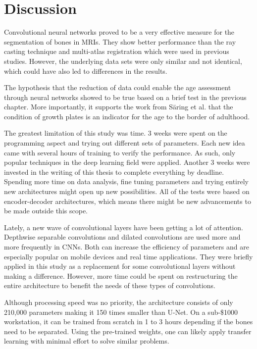\section{Discussion}

Convolutional neural networks proved to be a very effective measure for the segmentation of bones in MRIs. They show better performance than the ray casting technique and multi-atlas registration which were used in previous studies. However, the underlying data sets were only similar and not identical, which could have also led to differences in the results.

The hypothesis that the reduction of data could enable the age assessment through neural networks showed to be true based on a brief test in the previous chapter. More importantly, it supports the work from Säring et al. that the condition of growth plates is an indicator for the age to the border of adulthood.

The greatest limitation of this study was time. 3 weeks were spent on the programming aspect and trying out different sets of parameters. Each new idea came with several hours of training to verify the performance. As such, only popular techniques in the deep learning field were applied. Another 3 weeks were invested in the writing of this thesis to complete everything by deadline. Spending more time on data analysis, fine tuning parameters and trying entirely new architectures might open up new possibilities. All of the tests were based on encoder-decoder architectures, which means there might be new advancements to be made outside this scope.

Lately, a new wave of convolutional layers have been getting a lot of attention. Depthwise separable convolutions and dilated convolutions are used more and more frequently in CNNs. Both can increase the efficiency of parameters and are especially popular on mobile devices and real time applications. They were briefly applied in this study as a replacement for some convolutional layers without making a difference. However, more time could be spent on restructuring the entire architecture to benefit the needs of these types of convolutions.

Although processing speed was no priority, the architecture consists of only 210,000 parameters making it 150 times smaller than U-Net. On a sub-\$1000 workstation, it can be trained from scratch in 1 to 3 hours depending if the bones need to be separated. Using the pre-trained weights, one can likely apply transfer learning with minimal effort to solve similar problems.


